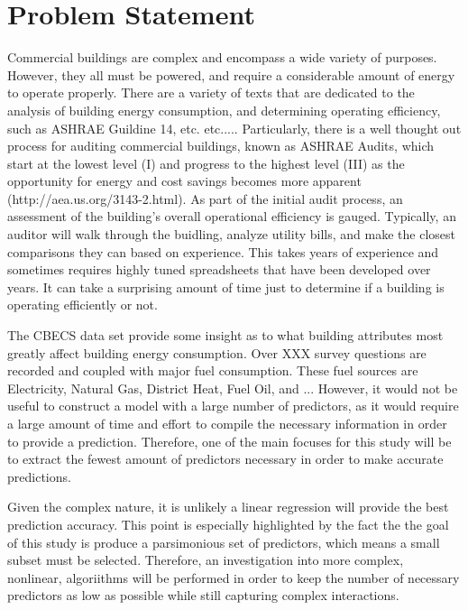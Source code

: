 {\section*{Problem Statement}}

Commercial buildings are complex and encompass a wide variety of purposes. However, they all must be powered, and require a considerable amount of energy to operate properly.  There are a variety of texts that are dedicated to the analysis of building energy consumption, and determining operating efficiency, such as ASHRAE Guildine 14, etc. etc.....  Particularly, there is a well thought out process for auditing commercial buildings, known as ASHRAE Audits, which start at the lowest level (I) and progress to the highest level (III) as the opportunity for energy and cost savings becomes more apparent (http://aea.us.org/3143-2.html).  As part of the initial audit process, an assessment of the building's overall operational efficiency is gauged.  Typically, an auditor will walk through the buidling, analyze utility bills, and make the closest comparisons they can based on experience.  This takes years of experience and sometimes requires highly tuned spreadsheets that have been developed over years.  It can take a surprising amount of time just to determine if a building is operating efficiently or not.

The CBECS data set provide some insight as to what building attributes most greatly affect building energy consumption.  Over XXX survey questions are recorded and coupled with major fuel consumption.  These fuel sources are Electricity, Natural Gas, District Heat, Fuel Oil, and ...  However, it would not be useful to construct a model with a large number of predictors, as it would require a large amount of time and effort to compile the necessary information in order to provide a prediction.  Therefore, one of the main focuses for this study will be to extract the fewest amount of predictors necessary in order to make accurate predictions.  

Given the complex nature, it is unlikely a linear regression will provide the best prediction accuracy.  This point is especially highlighted by the fact the the goal of this study is produce a parsimonious set of predictors, which means a small subset must be selected.  Therefore, an investigation into more complex, nonlinear, algoriithms will be performed in order to keep the number of necessary predictors as low as possible while still capturing complex interactions.